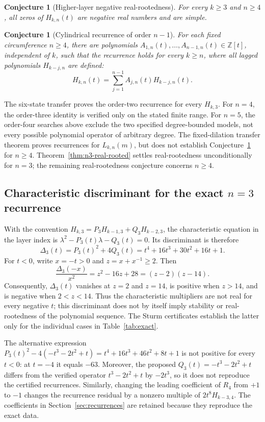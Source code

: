 \documentclass[11pt,a4paper]{article}
\newtheorem{conjecture}[theorem]{Conjecture}
\theoremstyle{definition}
\begin{document}
\begin{conjecture}[Higher-layer negative real-rootedness]
\label{conj:realrooted}
For every $k\ge3$ and $n\ge4$, all zeros of $H_{k,n}(t)$ are negative
real numbers and are simple.
\end{conjecture}

\begin{conjecture}[Cylindrical recurrence of order $n-1$]
\label{conj:universal-recurrence}
For each fixed circumference $n\ge4$, there are polynomials
$A_{1,n}(t),\ldots,A_{n-1,n}(t)\in\mathbb{Z}[t]$, independent of $k$,
such that the recurrence holds for every $k\ge n$, where all lagged
polynomials $H_{k-j,n}$ are defined:
\[
H_{k,n}(t)=\sum_{j=1}^{n-1}A_{j,n}(t)H_{k-j,n}(t).
\]
\end{conjecture}

The six-state transfer proves the order-two recurrence for every
$H_{k,3}$. For $n=4$, the order-three identity is verified only on the
stated finite range. For $n=5$, the order-four searches above exclude
the two specified degree-bounded models, not every possible polynomial
operator of arbitrary degree. The fixed-dilation transfer theorem proves
recurrences for $L_{k,n}(m)$, but does not establish
Conjecture~\ref{conj:universal-recurrence} for $n\ge4$.
Theorem~\ref{thm:n3-real-rooted} settles real-rootedness unconditionally
for $n=3$; the remaining real-rootedness conjecture concerns $n\ge4$.

\subsection[Characteristic discriminant for the exact n=3 recurrence]{Characteristic discriminant for the exact $n=3$ recurrence}

With the convention $H_{k,3}=P_3H_{k-1,3}+Q_3H_{k-2,3}$, the
characteristic equation in the layer index is
$\lambda^2-P_3(t)\lambda-Q_3(t)=0$. Its discriminant is therefore
\[
\Delta_3(t)=P_3(t)^2+4Q_3(t)
=t^4+16t^3+30t^2+16t+1.
\]
For $t<0$, write $x=-t>0$ and $z=x+x^{-1}\ge2$. Then
\[
\frac{\Delta_3(-x)}{x^2}=z^2-16z+28=(z-2)(z-14).
\]
Consequently, $\Delta_3(t)$ vanishes at $z=2$ and $z=14$, is positive
when $z>14$, and is negative when $2<z<14$. Thus the characteristic
multipliers are not real for every negative $t$; this discriminant does
not by itself imply stability or real-rootedness of the polynomial
sequence. The Sturm certificates establish the latter only for the
individual cases in Table~\ref{tab:exact}.

The alternative expression
$P_3(t)^2-4(-t^3-2t^2+t)=t^4+16t^3+46t^2+8t+1$
is not positive for every $t<0$: at $t=-4$ it equals $-63$. Moreover,
the proposed $Q_3(t)=-t^3-2t^2+t$ differs from the verified operator
$t^3-2t^2+t$ by $-2t^3$, so it does not reproduce the certified
recurrences. Similarly, changing the leading coefficient of $R_4$ from
$+1$ to $-1$ changes the recurrence residual by a nonzero multiple of
$2t^8H_{k-3,4}$. The coefficients in Section~\ref{sec:recurrences} are
retained because they reproduce the exact data.
\end{document}
